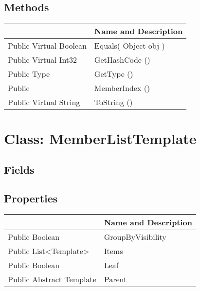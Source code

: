 \documentclass[11pt, oneside, a4paper]{book}
\begin{document}
\subsection{Methods}
\begin{center}
\begin{tabular}{| p{3cm} | p{12cm} | }
\hline
\textbf{ } & \textbf{ Name and Description}\\
\hline
 Public  Virtual  Boolean &  Equals(\hypertarget{SoftwareEngineeringTools.{}Documentation.{}MemberIndex.{}Equals\_Object}{} Object  obj  )\\
\hline
 Public  Virtual  Int32 &  GetHashCode ()\hypertarget{SoftwareEngineeringTools.{}Documentation.{}MemberIndex.{}GetHashCode}{}\\
\hline
 Public  Type &  GetType ()\hypertarget{SoftwareEngineeringTools.{}Documentation.{}MemberIndex.{}GetType}{}\\
\hline
 Public  &  MemberIndex ()\hypertarget{SoftwareEngineeringTools.{}Documentation.{}MemberIndex.{}MemberIndex}{}\\
\hline
 Public  Virtual  String &  ToString ()\hypertarget{SoftwareEngineeringTools.{}Documentation.{}MemberIndex.{}ToString}{}\\
\hline
\end{tabular}
\end{center}
 


\hypertarget{SoftwareEngineeringTools.{}Documentation.{}MemberListTemplate}{}
\section{Class: MemberListTemplate}

\subsection{Fields}

\subsection{Properties}
\begin{center}
\begin{tabular}{| p{3cm} | p{12cm} | }
\hline
\textbf{ } & \textbf{ Name and Description}\\
\hline
 Public  Boolean &  GroupByVisibility\hypertarget{SoftwareEngineeringTools.{}Documentation.{}MemberListTemplate.{}GroupByVisibility}{}\\
\hline
 Public  List<Template> &  Items\hypertarget{SoftwareEngineeringTools.{}Documentation.{}MemberListTemplate.{}Items}{}\\
\hline
 Public  Boolean &  Leaf\hypertarget{SoftwareEngineeringTools.{}Documentation.{}MemberListTemplate.{}Leaf}{}\\
\hline
 Public  Abstract  Template &  Parent\hypertarget{SoftwareEngineeringTools.{}Documentation.{}MemberListTemplate.{}Parent}{}\\
\hline
\end{tabular}
\end{center}
\end{document}
